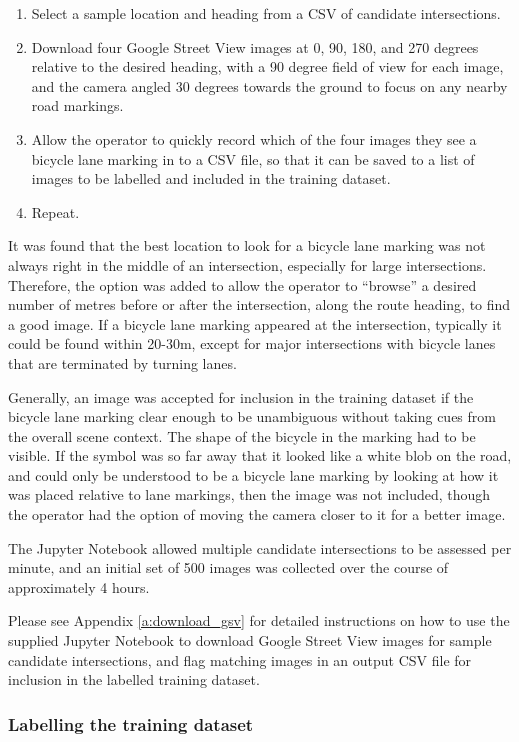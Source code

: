 \documentclass[11pt,twoside]{report}
\begin{document}
\begin{enumerate}
	\item{Select a sample location and heading from a CSV of candidate intersections.}
	\item{Download four Google Street View images at 0, 90, 180, and 270 degrees relative to the desired heading, with a 90 degree field of view for each image, and the camera angled 30 degrees towards the ground to focus on any nearby road markings.}
	\item{Allow the operator to quickly record which of the four images they see a bicycle lane marking in to a CSV file, so that it can be saved to a list of images to be labelled and included in the training dataset.}
	\item{Repeat.}
\end{enumerate}

It was found that the best location to look for a bicycle lane marking was not always right in the middle of an intersection, especially for large intersections.  Therefore, the option was added to allow the operator to ``browse'' a desired number of metres before or after the intersection, along the route heading, to find a good image.  If a bicycle lane marking appeared at the intersection, typically it could be found within 20-30m, except for major intersections with bicycle lanes that are terminated by turning lanes.

Generally, an image was accepted for inclusion in the training dataset if the bicycle lane marking clear enough to be unambiguous without taking cues from the overall scene context.  The shape of the bicycle in the marking had to be visible.  If the symbol was so far away that it looked like a white blob on the road, and could only be understood to be a bicycle lane marking by looking at how it was placed relative to lane markings, then the image was not included, though the operator had the option of moving the camera closer to it for a better image.

The Jupyter Notebook allowed multiple candidate intersections to be assessed per minute, and an initial set of 500 images was collected over the course of approximately 4 hours.

Please see Appendix \ref{a:download_gsv} for detailed instructions on how to use the supplied Jupyter Notebook to download Google Street View images for sample candidate intersections, and flag matching images in an output CSV file for inclusion in the labelled training dataset.


\subsubsection{Labelling the training dataset}
\label{s:label}
\end{document}
